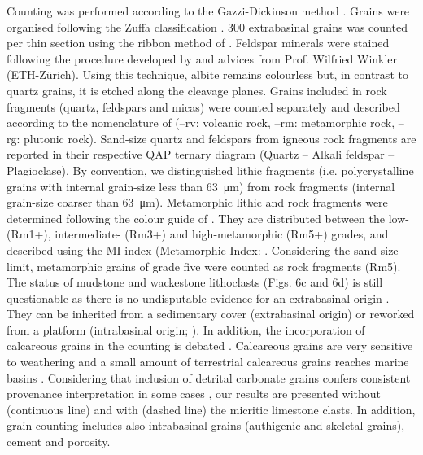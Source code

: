 \documentclass[twoside]{article}
\begin{document}
Counting was performed according to the Gazzi-Dickinson method \citep{Dickinson1979a,Ingersoll1979,Dickinson1985}. Grains were organised following the Zuffa classification \citep{Zuffa1980}. 300 extrabasinal grains was counted per thin section using the ribbon method of \cite{VanderPlas1962}. Feldspar minerals were stained following the procedure developed by \cite{Norman1974} and advices from Prof. Wilfried Winkler (ETH-Z\"urich). Using this technique, albite remains colourless but, in contrast to quartz grains, it is etched along the cleavage planes. Grains included in rock fragments (quartz, feldspars and micas) were counted separately \citep{Critelli2007,Stefani2007,DasGupta2008} and described according to the nomenclature of \cite{Weltje2002} (--rv: volcanic rock, --rm: metamorphic rock, --rg: plutonic rock). Sand-size quartz and feldspars from igneous rock fragments are reported in their respective QAP ternary diagram (Quartz -- Alkali feldspar -- Plagioclase). By convention, we distinguished lithic fragments (i.e. polycrystalline grains with internal grain-size less than \SI{63}{\micro\meter}) from rock fragments (internal grain-size coarser than \SI{63}{\micro\meter}). Metamorphic lithic and rock fragments were determined following the colour guide of \cite{Garzanti2003}. They are distributed between the low- (Rm1+), intermediate- (Rm3+) and high-metamorphic (Rm5+) grades, and described using the MI index (Metamorphic Index: \citealp{Garzanti2004,Garzanti2010}. Considering the sand-size limit, metamorphic grains of grade five were counted as rock fragments (Rm5). The status of mudstone and wackestone lithoclasts (Figs. 6c and 6d) is still questionable as there is no undisputable evidence for an extrabasinal origin \citep{Zuffa1980}. They can be inherited from a sedimentary cover (extrabasinal origin) or reworked from a platform (intrabasinal origin; \citealp{Critelli2007}). In addition, the incorporation of calcareous grains in the counting is debated \citep{Dickinson1979a,Mack1984}. Calcareous grains are very sensitive to weathering and a small amount of terrestrial calcareous grains reaches marine basins \citep{Arribas2000,Picard2007}. Considering that inclusion of detrital carbonate grains confers consistent provenance interpretation in some cases \citep{Mack1984}, our results are presented without (continuous line) and with (dashed line) the micritic limestone clasts. In addition, grain counting includes also intrabasinal grains (authigenic and skeletal grains), cement and porosity.\par
\medskip
\end{document}
